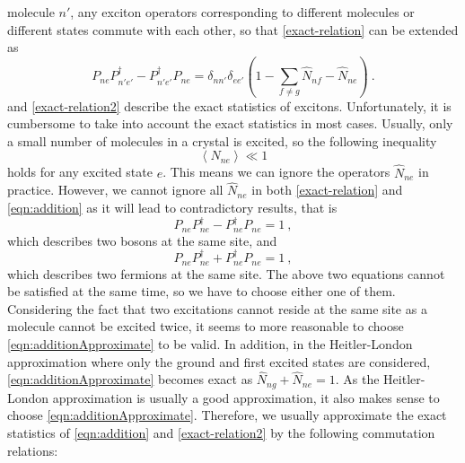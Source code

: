 molecule $n'$, any exciton operators corresponding to different molecules or different states
commute with each other, so that \autoref{exact-relation} can be extended as 
\begin{equation}
P_{ne}P_{n'e'}^{\dagger}-P_{n' e'}^{\dagger}P_{n e}  =  \delta_{nn'}\delta_{ee'}\left(1-\sum_{f\neq g}\hat{N}_{nf} -\hat{N}_{ne} \right)  \ . \label{exact-relation2}
\end{equation}
 and \autoref{exact-relation2} describe the exact
statistics of excitons.  Unfortunately, it is cumbersome to take into account  the exact
statistics in most cases. Usually, only a small number of molecules in a crystal is excited, so the following inequality
\begin{equation}
\left\langle N_{ne} \right\rangle \ll 1 \label{condition-for-Bose-approx}
\end{equation}
holds for any excited state $e$. This means we can ignore the operators $\hat{N}_{ne}$ in practice. However, we cannot
ignore all $\hat{N}_{ne}$ in both \autoref{exact-relation} and \autoref{eqn:addition} as it will lead to contradictory 
results, that is  
\begin{equation}
P_{ne} P_{ne}^{\dagger} - P_{ne}^{\dagger} P_{ne} = 1\ , \label{eqn:subtractionApproximate}
\end{equation}
which describes two bosons at the same site, 
and 
\begin{equation}
P_{ne} P_{ne}^{\dagger} + P_{ne}^{\dagger} P_{ne} = 1 \ , \label{eqn:additionApproximate}
\end{equation}
which describes two fermions at the same site. 
The above two equations cannot be satisfied at the same time, so we have to choose either one of them. Considering the 
fact that two excitations cannot reside at the same site as a molecule cannot be excited twice, 
it seems to more reasonable to choose \autoref{eqn:additionApproximate} to be valid. In addition, 
in the Heitler-London approximation where only the ground and first excited states are considered, 
\autoref{eqn:additionApproximate} becomes exact as $ \hat{N}_{ng}  + \hat{N}_{ne}=1$. As the Heitler-London 
approximation is usually a good approximation, it also makes sense to choose \autoref{eqn:additionApproximate}. 
Therefore, we usually approximate the exact statistics of \autoref{eqn:addition} and \autoref{exact-relation2} by  the following commutation relations: 
